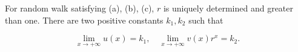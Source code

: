 For random walk satisfying (a), (b), (c), $r$ is uniquely determined and greater than one. There are two positive constants $k_1, k_2$ such that

$$\lim_{x \to +\infty} u(x) = k_1, \quad \lim_{x \to +\infty} v(x)r^x = k_2.$$